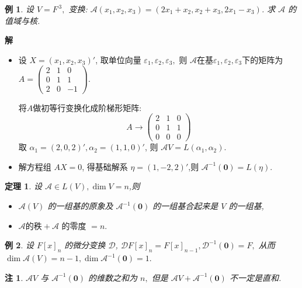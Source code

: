 \documentclass[13pt]{beamer}
\newtheorem{thm}{定理}
\newtheorem{exa}{例}
\newtheorem*{rem}{注}
\def\sol{{\bf 解~~ }}
\def\A{\mathscr{A}}
\def\D{\mathscr{D}}
\def\0{\mathbf{0}}
\begin{document}
\begin{frame}
\begin{exa}
设 $V=F^{\, 3},$ 变换: $\A \left(x_{1}, x_{2}, x_{3}\right)=\left(2 x_{1}+x_{2}, x_{2}+x_{3}, 2 x_{1}-x_{3}\right)$. 求 $\A $ 的值域与核.
\end{exa}
\sol 
\begin{itemize}
	\item 设 $X=\left( x_1, x_2, x_3 \right)'$, 
取单位向量 $\varepsilon_{1}, \varepsilon_{2}, \varepsilon_{3},$ 则 
$\A$在基$\varepsilon_{1}, \varepsilon_{2}, \varepsilon_{3}$下的矩阵为
$A=\left(\begin{array}{ccc}2 & 1 & 0 \\ 0 & 1 & 1 \\ 2 & 0 & -1\end{array}\right).$

将$A$做初等行变换化成阶梯形矩阵:
$$A\rightarrow\left(\begin{array}{ccc}2 & 1 & 0 \\ 0 & 1 & 1 \\ 0 & 0 & 0\end{array}\right)$$
取 $\alpha_{1}=(2,0,2)', \alpha_{2}=(1,1,0)'$, 
则 $\A V=L\left(\alpha_{1}, \alpha_{2}\right)$.

	\item  解方程组 $A X=0$, 得基础解系 $\eta=(1,-2,2)'$,则 $\A^{-1}(\0) =L(\eta)$.
\end{itemize}
\end{frame}



\begin{frame}
\begin{thm}
设 $\A  \in L(V), \operatorname{dim} V=n$,则 
\begin{itemize}
\item $\A (V)$ 的一组基的原象及 $\A^{-1}(\0)$ 的一组基合起来是 $V$ 的一组基,
\item $\A  \mbox{的秩}+ \A \mbox{ 的零度 }=n.$
\end{itemize}

\end{thm}

\begin{exa}
设 $F[x]_{n}$ 的微分变换 $\D$, 
$\D  F[x]_{n}=F[x]_{n-1}, \D ^{-1}(\0)=F,$ 从而 $\operatorname{dim} \A (V)=n-1, \operatorname{dim} \A ^{-1}(\0)=1 .$
\end{exa}

\begin{rem}
	$\A  V$ 与 $\A^{-1}(\0)$ 的维数之和为 $n,$ 但是 $\A  V+\A^{-1}(\0)$ 不一定是直和.
\end{rem}
\end{frame}
\end{document}
